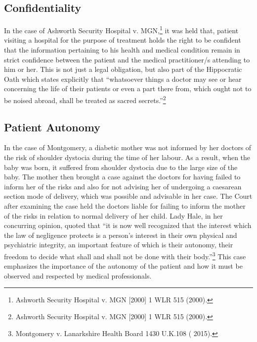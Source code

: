 \begin{multicols}{2}
\vspace{-.3cm}

\subsection*{Confidentiality}

\vspace{-.2cm}

\noi
In the case of Ashworth Security Hospital v. MGN,\footnote{Ashworth Security Hospital v. MGN [2000] 1 WLR 515 (2000).} it was held that, patient visiting a hospital for the purpose of treatment holds the right to be confident that the information
pertaining to his health and medical condition remain in strict confidence between the
patient and the medical practitioner/s attending to him or her. This is not just a legal
obligation, but also part of the Hippocratic Oath which states explicitly that “whatsoever
things a doctor may see or hear concerning the life of their patients or even a part there
from, which ought not to be noised abroad, shall be treated as sacred secrets.”\footnote{Ashworth Security Hospital v. MGN [2000] 1 WLR 515 (2000).}

\vspace{-.3cm}

\subsection*{Patient Autonomy}

\vspace{-.2cm}

\noi
In the case of Montgomery, a diabetic mother was not informed by her doctors of the
risk of shoulder dystocia during the time of her labour. As a result, when the baby was
born, it suffered from shoulder dystocia due to the large size of the baby. The mother
then brought a case against the doctors for having failed to inform her of the risks and
also for not advising her of undergoing a caesarean section mode of delivery, which
was possible and advisable in her case. The Court after examining the case held the
doctors liable for failing to inform the mother of the risks in relation to normal delivery of her child. Lady Hale, in her concurring opinion,
quoted that “it is now well recognized that the interest which the law of negligence
protects is a person’s interest in their own physical and psychiatric integrity, an
important feature of which is their autonomy, their freedom to decide what shall and
shall not be done with their body.”\footnote{Montgomery v. Lanarkshire Health Board 1430 U.K.108 ( 2015).} This case emphasizes the importance of the autonomy of the patient and how it must be observed and respected by medical professionals.


\end{multicols}
